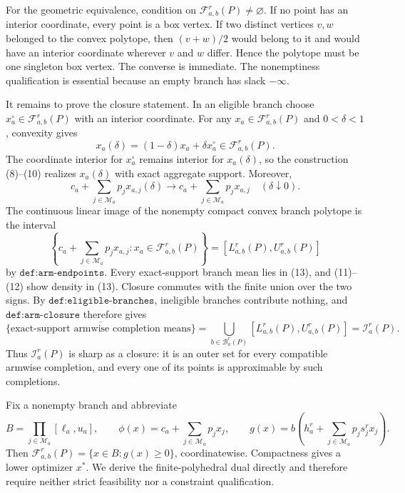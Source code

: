 For the geometric equivalence, condition on \(\mathcal F_{a,b}^r(P)\ne\varnothing\).  If no point has an interior coordinate, every point is a box vertex.  If two distinct vertices \(v,w\) belonged to the convex polytope, then \((v+w)/2\) would belong to it and would have an interior coordinate wherever \(v\) and \(w\) differ.  Hence the polytope must be one singleton box vertex.  The converse is immediate.  The nonemptiness qualification is essential because an empty branch has slack \(-\infty\).

It remains to prove the closure statement.  In an eligible branch choose \(x_a^\circ\in\mathcal F_{a,b}^r(P)\) with an interior coordinate.  For any \(x_a\in\mathcal F_{a,b}^r(P)\) and \(0<\delta<1\), convexity gives
\[
 x_a(\delta)=(1-\delta)x_a+\delta x_a^\circ\in\mathcal F_{a,b}^r(P).          \tag{11}
\]
The coordinate interior for \(x_a^\circ\) remains interior for \(x_a(\delta)\), so the construction (8)--(10) realizes \(x_a(\delta)\) with exact aggregate support.  Moreover,
\[
 c_a+\sum_{j\in\mathcal M_a}p_jx_{a,j}(\delta)
 \longrightarrow
 c_a+\sum_{j\in\mathcal M_a}p_jx_{a,j}
 \quad(\delta\downarrow0).                                                    \tag{12}
\]
The continuous linear image of the nonempty compact convex branch polytope is the interval
\[
 \left\{c_a+\sum_{j\in\mathcal M_a}p_jx_{a,j}:x_a\in\mathcal F_{a,b}^r(P)\right\}
 =[L_{a,b}^r(P),U_{a,b}^r(P)]                                                  \tag{13}
\]
by \(\texttt{def:arm-endpoints}\).  Every exact-support branch mean lies in (13), and (11)--(12) show density in (13).  Closure commutes with the finite union over the two signs.  By \(\texttt{def:eligible-branches}\), ineligible branches contribute nothing, and \(\texttt{def:arm-closure}\) therefore gives
\[
 \overline{\{\text{exact-support armwise completion means}\}}
 =\bigcup_{b\in\mathcal B_a^r(P)}[L_{a,b}^r(P),U_{a,b}^r(P)]
 =\mathcal I_a^r(P).                                                          \tag{14}
\]
Thus \(\mathcal I_a^r(P)\) is sharp as a closure: it is an outer set for every compatible armwise completion, and every one of its points is approximable by such completions.

Fix a nonempty branch and abbreviate
\[
 B=\prod_{j\in\mathcal M_a}[\ell_a,u_a],\qquad
 \phi(x)=c_a+\sum_{j\in\mathcal M_a}p_jx_j,\qquad
 g(x)=b\left(h_a^r+\sum_{j\in\mathcal M_a}p_js_j^rx_j\right).
\]
Then \(\mathcal F_{a,b}^r(P)=\{x\in B:g(x)\ge0\}\), coordinatewise.  Compactness gives a lower optimizer \(x^*\).  We derive the finite-polyhedral dual directly and therefore require neither strict feasibility nor a constraint qualification.


